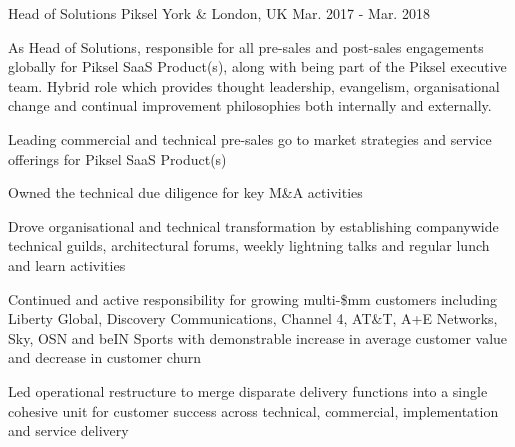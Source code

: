 \begin{cventries}

\cvexpentry
{Head of Solutions} %
{Piksel} %
{York \& London, UK} %
{Mar. 2017 - Mar. 2018} %
{
\begin{cvitemstitle}
\item {As Head of Solutions, responsible for all pre-sales and post-sales engagements globally for Piksel SaaS Product(s), along with being part of the Piksel executive team. Hybrid role which provides thought leadership, evangelism, organisational change and continual improvement philosophies both internally and externally.}
\end{cvitemstitle}
}
{ %
\begin{cvitems}
\item {Leading commercial and technical pre-sales go to market strategies and service offerings for Piksel SaaS Product(s)}
\item {Owned the technical due diligence for key M\&A activities}
\item {Drove organisational and technical transformation by establishing companywide technical guilds, architectural forums, weekly lightning talks and regular lunch and learn activities}
\item {Continued and active responsibility for growing multi-\$mm customers including Liberty Global, Discovery Communications, Channel 4, AT\&T, A+E Networks, Sky, OSN and beIN Sports with demonstrable increase in average customer value and decrease in customer churn}
\item {Led operational restructure to merge disparate delivery functions into a single cohesive unit for customer success across technical, commercial, implementation and service delivery}
\end{cvitems}
}



\end{cventries}
